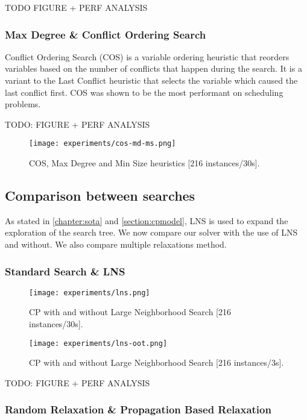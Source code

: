 \documentclass[../../thesis.tex]{subfiles}
\begin{document}
TODO FIGURE + PERF ANALYSIS 


\subsubsection{Max Degree \& Conflict Ordering Search}

Conflict Ordering Search (COS) \cite{Gay:COS} is a variable ordering heuristic that 
reorders variables based on the number of conflicts that happen during the search.
It is a variant to the Last Conflict heuristic that selects the variable which caused the last conflict first.
COS was shown to be the most performant on scheduling problems.


TODO: FIGURE + PERF ANALYSIS

\begin{figure}
  \centering
  \texttt{[image: experiments/cos-md-ms.png]}
  \caption{COS, Max Degree and Min Size heuristics [216 instances/30s].}
  \label{experiments:heuristics:3}
\end{figure}


\subsection{Comparison between searches}


As stated in \autoref{chapter:sota} and \autoref{section:cpmodel}, LNS is used to expand the exploration
of the search tree. We now compare our solver with the use of LNS and without. We also compare multiple 
relaxations method.


\subsubsection{Standard Search \& LNS}


\begin{figure}
  \centering
  \texttt{[image: experiments/lns.png]}
  \caption{CP with and without Large Neighborhood Search [216 instances/30s].}
  \label{experiments:lns}
\end{figure}

\begin{figure}
  \centering
  \texttt{[image: experiments/lns-oot.png]}
  \caption{CP with and without Large Neighborhood Search [216 instances/3s].}
  \label{experiments:lns-oot}
\end{figure}


TODO: FIGURE + PERF ANALYSIS


\subsubsection{Random Relaxation \& Propagation Based Relaxation}
\end{document}

